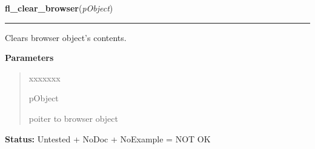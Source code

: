     \label{xformslib:library:fl_clear_browser}

    \vspace{0.5ex}

\hspace{.8\funcindent}\begin{boxedminipage}{\funcwidth}

    \raggedright \textbf{fl\_clear\_browser}(\textit{pObject})

    \vspace{-1.5ex}

    \rule{\textwidth}{0.5\fboxrule}
\setlength{\parskip}{2ex}
    Clears browser object's contents.

\setlength{\parskip}{1ex}
      \textbf{Parameters}
      \vspace{-1ex}

      \begin{quote}
        \begin{Ventry}{xxxxxxx}

          \item[pObject]

          poiter to browser object

        \end{Ventry}

      \end{quote}

\textbf{Status:} Untested + NoDoc + NoExample = NOT OK



    \end{boxedminipage}

    \label{xformslib:library:fl_add_browser_line}

    \vspace{0.5ex}

